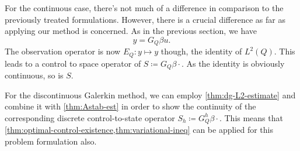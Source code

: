\documentclass[../thesis.tex]{subfiles}
\begin{document}
For the continuous case, there's not much of a difference in comparison to the previously treated formulations.
However, there is a crucial difference as far as applying our method is concerned.
As in the previous section, we have
\[
	y = G_Q \beta u.
\]
The observation operator is now $E_Q : y \mapsto y$ though, the identity of $L^2(Q)$. This leads to a control to space operator of $S \coloneqq G_Q \beta \cdot$. As the identity is obviously continuous, so is $S$.

For the discontinuous Galerkin method, we can employ \cref{thm:dg-L2-estimate} and combine it with \cref{thm:Astab-est} in order to show the continuity of the corresponding discrete control-to-state operator $S_h \coloneqq G_Q^h \beta \cdot$.
This means that \cref{thm:optimal-control-existence,thm:variational-ineq} can be applied for this problem formulation also.
\end{document}
